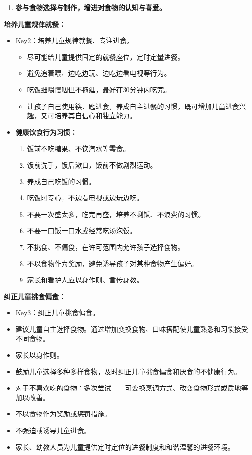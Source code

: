 \begin{keybox}
\begin{enumerate}[leftmargin=*]
    \item \textbf{参与食物选择与制作，增进对食物的认知与喜爱。}
\end{enumerate}

\textbf{培养儿童规律就餐：}
\begin{itemize}[leftmargin=*]
    \item Key2：培养儿童规律就餐、专注进食。
    \begin{itemize}
        \item 尽可能给儿童提供固定的就餐座位，定时定量进餐。
        \item 避免追着喂、边吃边玩、边吃边看电视等行为。
        \item 吃饭细嚼慢咽但不拖延，最好在30分钟内吃完。
        \item 让孩子自己使用筷、匙进食，养成自主进餐的习惯，既可增加儿童进食兴趣，又可培养其自信心和独立能力。
    \end{itemize}

    \item \textbf{健康饮食行为习惯：}
    \begin{enumerate}
        \item 饭前不吃糖果、不饮汽水等零食。
        \item 饭前洗手，饭后漱口，饭前不做剧烈运动。
        \item 养成自己吃饭的习惯。
        \item 吃饭时专心，不边看电视或边玩边吃。
        \item 不要一次盛太多，吃完再盛，培养不剩饭、不浪费的习惯。
        \item 不要一口饭一口水或经常吃汤泡饭。
        \item 不挑食、不偏食，在许可范围内允许孩子选择食物。
        \item 不以食物作为奖励，避免诱导孩子对某种食物产生偏好。
        \item 家长和看护人应以身作则、言传身教。
    \end{enumerate}
\end{itemize}

\textbf{纠正儿童挑食偏食：}
\begin{itemize}[leftmargin=*]
    \item Key3：纠正儿童挑食偏食。
    \item 建议儿童自主选择食物。通过增加变换食物、口味搭配使儿童熟悉和习惯接受不同食物。
    \item 家长以身作则。
    \item 鼓励儿童选择多种多样食物，及时纠正儿童挑食偏食和厌食的不健康行为。
    \item 对于不喜欢吃的食物：多次尝试——可变换烹调方式、改变食物形式或质地等加以改善。
    \item 不以食物作为奖励或惩罚措施。
    \item 不强迫或诱导儿童进食。
    \item 家长、幼教人员为儿童提供定时定位的进餐制度和和谐温馨的进餐环境。
\end{itemize}


\end{keybox}
